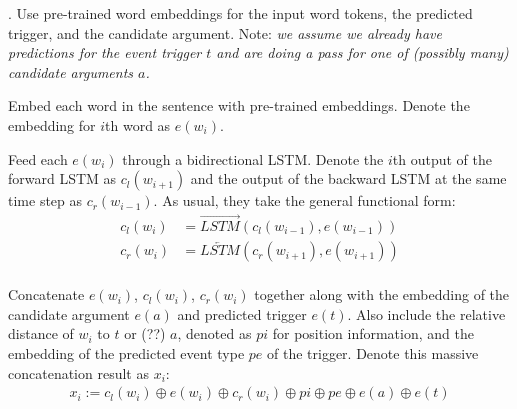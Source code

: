 \documentclass[11pt]{article}
\newcommand\myspace[1][]{\vspace{#1\bigskipamount}}
\newcommand\p{\Needspace{10\baselineskip} \noindent}
\begin{document}
\myspace
\p {}. Use pre-trained word embeddings for the input word tokens, the predicted trigger, and the candidate argument. Note: \textit{we assume we already have predictions for the event trigger $t$ and are doing a pass for one of (possibly many) candidate arguments $a$.}


\begin{compactenum}
	\item Embed each word in the sentence with pre-trained embeddings. Denote the embedding for $i$th word as $e(w_i)$. 
	
	\item Feed each $e(w_i)$ through a bidirectional LSTM. Denote the $i$th output of the forward LSTM as $c_l(w_{i+1})$ and the output of the backward LSTM at the same time step as $c_r(w_{i - 1})$. As usual, they take the general functional form:
	\begin{align}
	c_l(w_i) &= \overrightarrow{LSTM}\left(c_l(w_{i - 1}), e(w_{i-1}) \right) \\
	c_r(w_i) &= \overleftarrow{LSTM}\left(c_r(w_{i + 1}), e(w_{i+1}) \right) \\
	\end{align}
	
	\item Concatenate $e(w_i)$, $c_l(w_i)$, $c_r(w_i)$ together along with the embedding of the candidate argument $e(a)$ and predicted trigger $e(t)$. Also include the relative distance of $w_i$ to $t$ or (??) $a$, denoted as $pi$ for position information, and the embedding of the predicted event type $pe$ of the trigger. Denote this massive concatenation result as $x_i$:
	\begin{align}
		x_i := c_l(w_i) \oplus e(w_i) \oplus c_r(w_i) \oplus pi \oplus pe \oplus e(a) \oplus e(t) \label{fat-concat}
	\end{align}
	
\end{compactenum}
\end{document}
